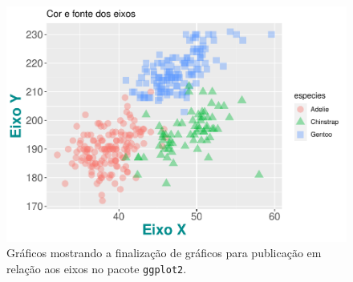 \documentclass[
]{article}
\begin{document}
\begin{figure}
\centering
\includegraphics{epr_files/figure-latex/fig-plot-final-eixos-fonte-1.pdf}
\caption{\label{fig:fig-plot-final-eixos-fonte-1}Gráficos mostrando a finalização de gráficos para publicação em relação aos eixos no pacote \texttt{ggplot2}.}
\end{figure}
\end{document}
